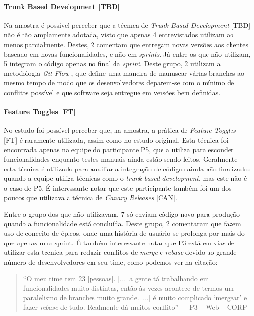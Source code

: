 \paragraph{Trunk Based Development [TBD]}
Na amostra é possível perceber que a técnica de \emph{Trunk Based Development} [TBD] \cite{devAndDeploymentFB} não é tão amplamente adotada, visto que apenas 4 entrevistados utilizam ao menos parcialmente. Destes, 2 comentam que entregam novas versões aos clientes baseado em novas funcionalidades, e não em \emph{sprints}. Já entre os que não utilizam, 5 integram o código apenas no final da \emph{sprint}. Deste grupo, 2 utilizam a metodologia \emph{Git Flow} \cite{gitFlow}, que define uma maneira de manusear várias branches ao mesmo tempo de modo que os desenvolvedores deparem-se com o mínimo de conflitos possível e que software seja entregue em versões bem definidas.

\paragraph{Feature Toggles [FT]}

No estudo foi possível perceber que, na amostra, a prática de \emph{Feature Toggles} [FT] \cite{featureToggles} é raramente utilizada, assim como no estudo original. Esta técnica foi encontrada apenas na equipe do participante P5, que a utiliza para esconder funcionalidades enquanto testes manuais ainda estão sendo feitos. Geralmente esta técnica é utilizada para auxiliar a integração de códigos ainda não finalizados quando a equipe utiliza técnicas como o \emph{trunk based development}, mas este não é o caso de P5. É interessante notar que este participante também foi um dos poucos que utilizava a técnica de \emph{Canary Releases} [CAN].

Entre o grupo dos que não utilizavam, 7 só enviam código novo para produção quando a funcionalidade está concluída. Deste grupo, 2 comentaram que fazem uso de conceito de épicos, onde uma história de usuário se prolonga por mais do que apenas uma sprint. É também interessante notar que P3 está em vias de utilizar esta técnica para reduzir conflitos de \emph{merge} e \emph{rebase} devido ao grande número de desenvolvedores em seu time, como podemos ver na citação:


\begin{quote}
    ``O meu time tem 23 [pessoas]. [...] a gente tá trabalhando em funcionalidades muito distintas, então às vezes acontece de termos um paralelismo de branches muito grande. [...] é muito complicado `mergear' e fazer \emph{rebase} de tudo. Realmente dá muitos conflito'' --- P3 -- Web -- CORP
\end{quote}


